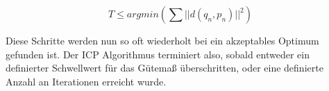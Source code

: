 \begin{equation}
T \leq argmin (\sum || d(q_{n}, p_{n}) || ^{2})
\end{equation}

\noindent Diese Schritte werden nun so oft wiederholt bei ein akzeptables Optimum gefunden ist. Der ICP Algorithmus terminiert also, sobald entweder ein definierter Schwellwert für das Gütemaß überschritten, oder eine definierte Anzahl an Iterationen erreicht wurde.
